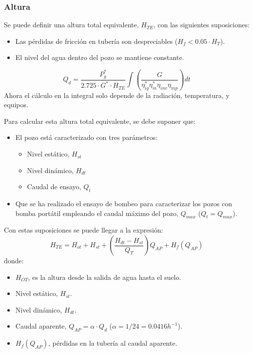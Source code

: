 \subsubsection{Altura}
\label{sec:orgab049d1}
Se puede definir una altura total equivalente, \(H_{TE}\), con las siguientes suposiciones:
\begin{itemize}
\item Las pérdidas de fricción en tubería son despreciables (\(H_f < 0.05 \cdot H_T\)).
\item El nivel del agua dentro del pozo se mantiene constante.
\end{itemize}
\begin{equation}
Q_d = \frac{P^*_g}{2.725 \cdot G^* \cdot H_{TE}} \int \left( \frac{G}{\eta_{ig}^{*} \eta_{m}^{*} \eta_{inv} \eta_{mp}} \right) dt
\end{equation}
Ahora el cálculo en la integral solo depende de la radiación, temperatura, y equipos.

Para calcular esta altura total equivalente, se debe suponer que:
\begin{itemize}
\item El pozo está caracterizado con tres parámetros:
\begin{itemize}
\item Nivel estático, \(H_{st}\)
\item Nivel dinámico, \(H_{dt}\)
\item Caudal de ensayo, \(Q_t\) 
\end{itemize}
\item Que se ha realizado el ensayo de bombeo para caracterizar los pozos con bomba portátil empleando el caudal máximo del pozo, \(Q_{max}\) (\(Q_t=Q_{max}\)).
\end{itemize}

Con estas suposiciones se puede llegar a la expresión:
\begin{equation}
H_{TE} = H_{ot} + H_{st} + \left( \frac{H_{dt} - H_{st}}{Q_T} \right) Q_{AP} + H_f(Q_{AP})
\end{equation}
donde:
\begin{itemize}
\item \(H_{OT}\), es la altura desde la salida de agua hasta el suelo.
\item Nivel estático, \(H_{st}\).
\item Nivel dinámico, \(H_{dt}\).
\item Caudal aparente, \(Q_{AP} = \alpha \cdot Q_d\)
(\(\alpha=1/24=0.0416h^{-1}\)).
\item \(H_f(Q_{AP})\), pérdidas en la tubería al caudal aparente.
\end{itemize}

